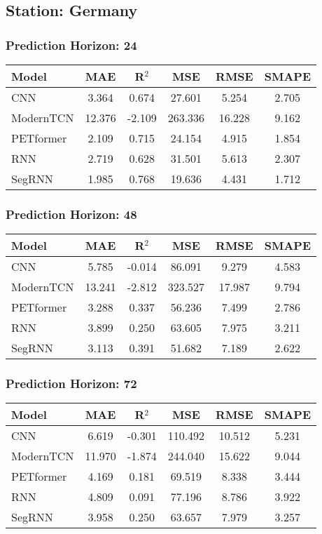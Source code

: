 \subsection*{Station: Germany}
\subsubsection*{Prediction Horizon: 24}
\begin{tabular}{lccccc}
\toprule
Model & MAE & R$^2$ & MSE & RMSE & SMAPE \\
\midrule
CNN & 3.364 & 0.674 & 27.601 & 5.254 & 2.705 \\
ModernTCN & 12.376 & -2.109 & 263.336 & 16.228 & 9.162 \\
PETformer & 2.109 & 0.715 & 24.154 & 4.915 & 1.854 \\
RNN & 2.719 & 0.628 & 31.501 & 5.613 & 2.307 \\
SegRNN & 1.985 & 0.768 & 19.636 & 4.431 & 1.712 \\
\bottomrule
\end{tabular}
\vspace{0.5cm}
\subsubsection*{Prediction Horizon: 48}
\begin{tabular}{lccccc}
\toprule
Model & MAE & R$^2$ & MSE & RMSE & SMAPE \\
\midrule
CNN & 5.785 & -0.014 & 86.091 & 9.279 & 4.583 \\
ModernTCN & 13.241 & -2.812 & 323.527 & 17.987 & 9.794 \\
PETformer & 3.288 & 0.337 & 56.236 & 7.499 & 2.786 \\
RNN & 3.899 & 0.250 & 63.605 & 7.975 & 3.211 \\
SegRNN & 3.113 & 0.391 & 51.682 & 7.189 & 2.622 \\
\bottomrule
\end{tabular}
\vspace{0.5cm}
\subsubsection*{Prediction Horizon: 72}
\begin{tabular}{lccccc}
\toprule
Model & MAE & R$^2$ & MSE & RMSE & SMAPE \\
\midrule
CNN & 6.619 & -0.301 & 110.492 & 10.512 & 5.231 \\
ModernTCN & 11.970 & -1.874 & 244.040 & 15.622 & 9.044 \\
PETformer & 4.169 & 0.181 & 69.519 & 8.338 & 3.444 \\
RNN & 4.809 & 0.091 & 77.196 & 8.786 & 3.922 \\
SegRNN & 3.958 & 0.250 & 63.657 & 7.979 & 3.257 \\
\bottomrule
\end{tabular}
\vspace{0.5cm}